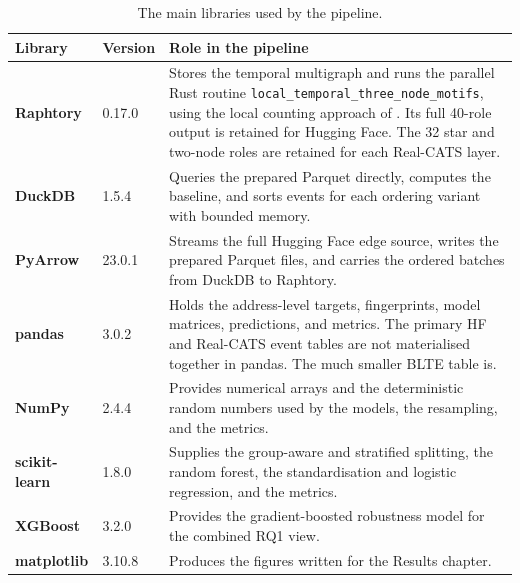 \documentclass{thesisclass}
\begin{document}
\begin{table}[h]
\centering
\caption{The main libraries used by the pipeline.}
\label{tab:libraries}
\renewcommand{\arraystretch}{1.3}
\small
\begin{tabular}{p{2.7cm} p{1.5cm} p{8.5cm}}
\toprule
\textbf{Library} & \textbf{Version} & \textbf{Role in the pipeline} \\
\midrule

\textbf{Raphtory} &
  0.17.0 &
  Stores the temporal multigraph and runs the parallel Rust routine
  \texttt{local\_temporal\_three\_node\_motifs}, using the local counting
  approach of \citet{arnold2024motifs}. Its full 40-role output is retained for Hugging Face.
  The 32 star and two-node roles are retained for each Real-CATS layer. \\

\textbf{DuckDB} &
  1.5.4 &
  Queries the prepared Parquet directly, computes the baseline, and sorts events
  for each ordering variant with bounded memory. \\

\textbf{PyArrow} &
  23.0.1 &
  Streams the full Hugging Face edge source, writes the prepared Parquet files,
  and carries the ordered batches from DuckDB to Raphtory. \\

\textbf{pandas} &
  3.0.2 &
  Holds the address-level targets, fingerprints, model matrices, predictions, and
  metrics. The primary HF and Real-CATS event tables are not materialised
  together in pandas. The much smaller BLTE table is. \\

\textbf{NumPy} &
  2.4.4 &
  Provides numerical arrays and the deterministic random numbers used by the
  models, the resampling, and the metrics. \\

\textbf{scikit-learn} &
  1.8.0 &
  Supplies the group-aware and stratified splitting, the random forest, the
  standardisation and logistic regression, and the metrics. \\

\textbf{XGBoost} &
  3.2.0 &
  Provides the gradient-boosted robustness model for the combined RQ1 view. \\

\textbf{matplotlib} &
  3.10.8 &
  Produces the figures written for the Results chapter. \\

\bottomrule
\end{tabular}
\end{table}
\end{document}
